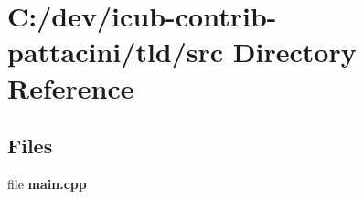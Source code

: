 \section{C\+:/dev/icub-\/contrib-\/pattacini/tld/src Directory Reference}
\label{dir_6a35aff29eb89fc3678e61225e4ed9ab}
\subsection*{Files}
\begin{DoxyCompactItemize}
\item 
file {\bfseries main.\+cpp}
\end{DoxyCompactItemize}
